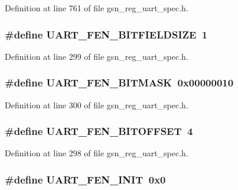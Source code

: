 Definition at line 761 of file gsn\_\-reg\_\-uart\_\-spec.h.

\hypertarget{a00575_a78a47af3260117e18c3ac46a896b67d6}{
\subsubsection[{UART\_\-FEN\_\-BITFIELDSIZE}]{\setlength{\rightskip}{0pt plus 5cm}\#define UART\_\-FEN\_\-BITFIELDSIZE~1}}
\label{a00575_a78a47af3260117e18c3ac46a896b67d6}


Definition at line 299 of file gsn\_\-reg\_\-uart\_\-spec.h.

\hypertarget{a00575_a2e18c386f4911d40d9cfb234990fda33}{
\subsubsection[{UART\_\-FEN\_\-BITMASK}]{\setlength{\rightskip}{0pt plus 5cm}\#define UART\_\-FEN\_\-BITMASK~0x00000010}}
\label{a00575_a2e18c386f4911d40d9cfb234990fda33}


Definition at line 300 of file gsn\_\-reg\_\-uart\_\-spec.h.

\hypertarget{a00575_afc3ed8faf3d384645379ad2f5c241cd7}{
\subsubsection[{UART\_\-FEN\_\-BITOFFSET}]{\setlength{\rightskip}{0pt plus 5cm}\#define UART\_\-FEN\_\-BITOFFSET~4}}
\label{a00575_afc3ed8faf3d384645379ad2f5c241cd7}


Definition at line 298 of file gsn\_\-reg\_\-uart\_\-spec.h.

\hypertarget{a00575_a0c9cb0d76c48f65d4e55248ebcbc7ac3}{
\subsubsection[{UART\_\-FEN\_\-INIT}]{\setlength{\rightskip}{0pt plus 5cm}\#define UART\_\-FEN\_\-INIT~0x0}}
\label{a00575_a0c9cb0d76c48f65d4e55248ebcbc7ac3}


